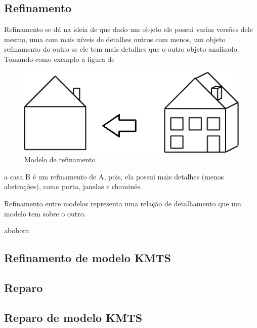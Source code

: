\subsection{Refinamento}

Refinamento se dá na ideia de que dado um objeto ele possui varias versões dele mesmo, uma com mais níveis de detalhes outros com menos, um objeto refinamento do outro se ele tem mais detalhes que o outro objeto analisado. Tomando como exemplo a figura de \cite{machado2017uso}

\begin{figure}[H]
\begin{center}
\includegraphics[scale=0.4]{images/refinement1.png}
\caption{Modelo de refinamento}
\label{classificacao-pares}
\end{center}
\end{figure}

a casa B é um refinamento de A, pois, ela possui mais detalhes (menos abstrações), como porta, janelas e chaminés.

Refinamento entre modelos representa uma relação de detalhamento que um modelo tem sobre o outro.


\theoremstyle{definition}
\begin{definition}
abobora
\end{definition}

\subsection{Refinamento de modelo KMTS}

\subsection{Reparo}

\theoremstyle{definition}
\begin{definition}

\end{definition}

\subsection{Reparo de modelo KMTS}

